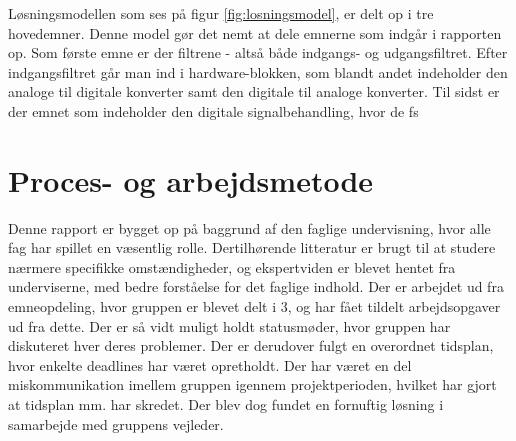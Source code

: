 Løsningsmodellen som ses på figur \ref{fig:losningsmodel}, er delt op i tre hovedemner. Denne model gør det nemt at dele emnerne som indgår i rapporten op. Som første emne er der filtrene - altså både indgangs- og udgangsfiltret. Efter indgangsfiltret går man ind i hardware-blokken, som blandt andet indeholder den analoge til digitale konverter samt den digitale til analoge konverter. Til sidst er der emnet som indeholder den digitale signalbehandling, hvor de fs

\section{Proces- og arbejdsmetode}
Denne rapport er bygget op på baggrund af den faglige undervisning, hvor alle fag har spillet en væsentlig rolle. Dertilhørende litteratur er brugt til at studere nærmere specifikke omstændigheder, og ekspertviden er blevet hentet fra underviserne, med bedre forståelse for det faglige indhold. Der er arbejdet ud fra emneopdeling, hvor gruppen er blevet delt i 3, og har fået tildelt arbejdsopgaver ud fra dette. Der er så vidt muligt holdt statusmøder, hvor gruppen har diskuteret hver deres problemer. Der er derudover fulgt en overordnet tidsplan, hvor enkelte deadlines har været opretholdt. Der har været en del miskommunikation imellem gruppen igennem projektperioden, hvilket har gjort at tidsplan mm. har skredet. Der blev dog fundet en fornuftig løsning i samarbejde med gruppens vejleder.



